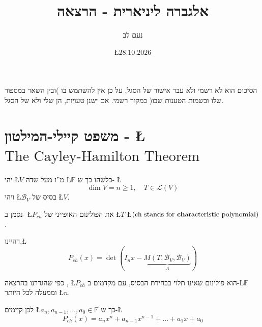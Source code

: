 \documentclass[english,hebrew]{article}
\begin{document}
\title{אלגברה ליניארית {\endL} - הרצאה {\endL}}
\author{נעם לב}
\date{\L{$28.10.2026$}}

\maketitle
\noindent{}
\begin{center}
הסיכום הוא לא רשמי ולא עבר אישור של הסגל, על כן אין להשתמש בו )ובין
השאר במספור שלו ובשמות הטענות שבו( כמקור רשמי. אם ישנן טעויות, הן
שלי ולא של הסגל.
\par\end{center}

\medskip{}

\tableofcontents{}

\newpage{}

\section{משפט קיילי-המילטון - \L{$\text{The Cayley-Hamilton Theorem}$}}

יהי \L{$V$} מ\textquotedblright ו מעל שדה \L{$\mathbb{F}$} כלשהו
כך ש- \L{%
\[
\dim V=n\geq1,\quad T\in\mathcal{L}(V)
\]
}%
ויהי \L{$\mathcal{B}_{V}$} בסיס של \L{$V$}.

נסמן ב- \L{$P_{ch}$} את הפולינום האופייני של \L{$T$} \L{$\left(\text{ch stands for \textbf{ch}aracteristic polynomial}\right)$}.

דהיינו,\L{%
\[
P_{ch}(x)=\det\left(I_{n}x-\underset{A}{\underbrace{M(T,\mathcal{B}_{V},\mathcal{B}_{V})}}\right)
\]
}%

כפי שהגדרנו בהרצאה {\endL}, \L{$P_{ch}$} הוא פולינום שאינו
תלוי בבחירת הבסיס, עם מקדמים ב-\L{$\mathbb{F}$} וממעלה לכל היותר
\L{$n$}.

לכן קיימים \L{$a_{n},a_{n-1},\dots,a_{0}\in\mathbb{F}$} כך ש-\L{%
\[
P_{ch}(x)=a_{n}x^{n}+a_{n-1}x^{n-1}+\dots+a_{1}x+a_{0}
\]
}%
\end{document}
